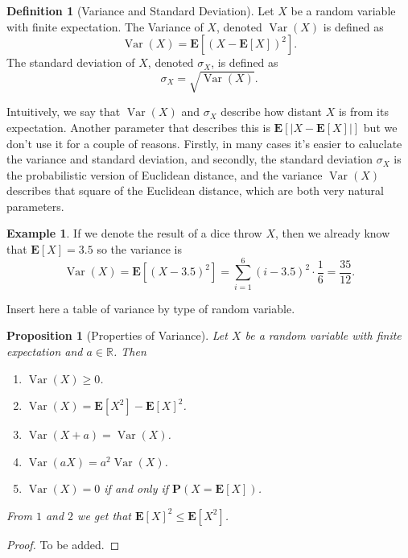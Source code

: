 \documentclass[11pt,a4paper]{article}
\theoremstyle{definition}
\newtheorem{definition}{Definition}[section]
\newtheorem{example}{Example}[section]
\theoremstyle{plain}
\newtheorem{proposition}[theorem]{Proposition}
\DeclareMathOperator{\Var}{Var}
\newcommand{\R}{\mathbb{R}}
\newcommand{\E}{\mathbf{E}}
\newcommand{\Prob}{\mathbf{P}}
\newcommand{\abs}[1]{\left\lvert #1\right\rvert}
\begin{document}
  \begin{definition}[Variance and Standard Deviation]
    Let $X$ be a random variable with finite expectation. The Variance of
    $X$, denoted $\Var(X)$ is defined as
    \[
      \Var(X) = \E\left[ (X - \E[X])^2 \right].
    \]
    The standard deviation of $X$, denoted $\sigma_X$, is defined as
    \[
      \sigma_X = \sqrt{\Var(X)}.
    \]
  \end{definition}
  
  Intuitively, we say that $\Var(X)$ and $\sigma_X$ describe how distant $X$
  is from its expectation. Another parameter that describes this is
  $\E\left[ \abs{X - \E[X]} \right]$ but we don't use it
  for a couple of reasons. Firstly, in many cases it's easier to caluclate
  the variance and standard deviation, and secondly, the standard deviation
  $\sigma_X$ is the probabilistic version of Euclidean distance, and the 
  variance $\Var(X)$ describes that square of the Euclidean distance, which
  are both very natural parameters.

  \begin{example}
    If we denote the result of a dice throw $X$, then we already know
    that $\E[X] = 3.5$ so the variance is
    \[
      \Var(X) =
      \E\left[ (X - 3.5)^2 \right] =
      \sum_{i=1}^{6} (i - 3.5)^2 \cdot \frac{1}{6} =
      \frac{35}{12}.
    \]
  \end{example}

  Insert here a table of variance by type of random variable.

  \begin{proposition}[Properties of Variance]
    Let $X$ be a random variable with finite expectation and $a \in \R$. Then
    \begin{enumerate}
      \item $\Var(X) \geq 0$.
      \item $\Var(X) = \E[X^2] - \E[X]^2$.
      \item $\Var(X + a) = \Var(X)$.
      \item $\Var(aX) = a^2 \Var(X)$.
      \item $\Var(X) = 0$ if and only if $\Prob(X = \E[X])$.
    \end{enumerate}
    From $1$ and $2$ we get that $\E[X]^2 \le \E[X^2]$.
  \end{proposition}
  \begin{proof}
    To be added.
  \end{proof}
\end{document}
